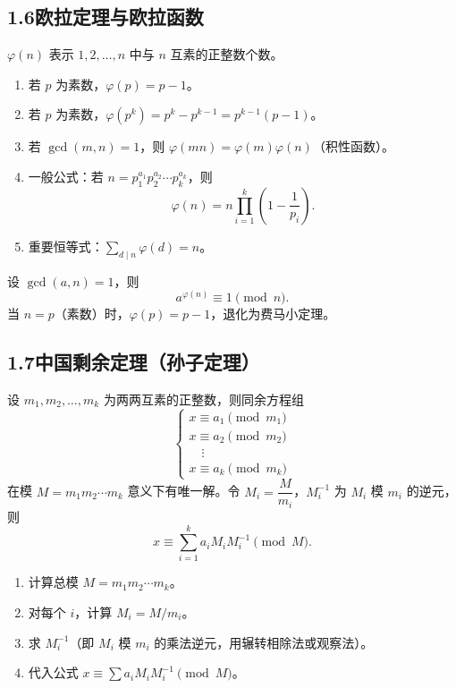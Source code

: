 \documentclass[12pt, a4paper]{ctexart}
\begin{document}
\subsection*{1.6\quad 欧拉定理与欧拉函数}

\begin{knowledgebox}
$\varphi(n)$ 表示 $1, 2, \ldots, n$ 中与 $n$ 互素的正整数个数。
\begin{enumerate}[label=(\arabic*)]
  \item 若 $p$ 为素数，$\varphi(p) = p - 1$。
  \item 若 $p$ 为素数，$\varphi(p^k) = p^k - p^{k-1} = p^{k-1}(p-1)$。
  \item 若 $\gcd(m, n) = 1$，则 $\varphi(mn) = \varphi(m)\varphi(n)$（积性函数）。
  \item 一般公式：若 $n = p_1^{a_1} p_2^{a_2} \cdots p_k^{a_k}$，则
  \[ \varphi(n) = n \prod_{i=1}^{k} \left(1 - \frac{1}{p_i}\right). \]
  \item 重要恒等式：$\displaystyle\sum_{d \mid n} \varphi(d) = n$。
\end{enumerate}
\end{knowledgebox}

\begin{knowledgebox}[欧拉定理]
设 $\gcd(a, n) = 1$，则
\[ a^{\varphi(n)} \equiv 1 \pmod{n}. \]
当 $n = p$（素数）时，$\varphi(p) = p - 1$，退化为费马小定理。
\end{knowledgebox}

\subsection*{1.7\quad 中国剩余定理（孙子定理）}

\begin{knowledgebox}[中国剩余定理]
设 $m_1, m_2, \ldots, m_k$ 为两两互素的正整数，则同余方程组
\[
\begin{cases}
x \equiv a_1 \pmod{m_1} \\
x \equiv a_2 \pmod{m_2} \\
\quad \vdots \\
x \equiv a_k \pmod{m_k}
\end{cases}
\]
在模 $M = m_1 m_2 \cdots m_k$ 意义下有唯一解。令 $M_i = \dfrac{M}{m_i}$，$M_i^{-1}$ 为 $M_i$ 模 $m_i$ 的逆元，则
\[ x \equiv \sum_{i=1}^{k} a_i M_i M_i^{-1} \pmod{M}. \]
\end{knowledgebox}

\begin{tipbox}[解题步骤]
\begin{enumerate}[label=\textbf{步骤\arabic*}]
  \item 计算总模 $M = m_1 m_2 \cdots m_k$。
  \item 对每个 $i$，计算 $M_i = M / m_i$。
  \item 求 $M_i^{-1}$（即 $M_i$ 模 $m_i$ 的乘法逆元，用辗转相除法或观察法）。
  \item 代入公式 $x \equiv \sum a_i M_i M_i^{-1} \pmod{M}$。
\end{enumerate}
\end{tipbox}
\end{document}
